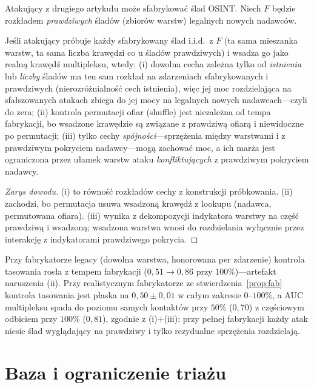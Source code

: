 Atakujący z drugiego artykułu może sfabrykować ślad OSINT. Niech $F$
będzie rozkładem \emph{prawdziwych} śladów (zbiorów warstw) legalnych
nowych nadawców.

\begin{proposition}
\label{prop:fab}
Jeśli atakujący próbuje każdy sfabrykowany ślad i.i.d.\ z $F$ (ta sama
mieszanka warstw, ta sama liczba krawędzi co u śladów prawdziwych) i
wsadza go jako realną krawędź multipleksu, wtedy:
(i) dowolna cecha zależna tylko od \emph{istnienia} lub \emph{liczby}
śladów ma ten sam rozkład na zdarzeniach sfabrykowanych i prawdziwych
(nierozróżnialność cech istnienia), więc jej moc rozdzielająca na
sfałszowanych atakach zbiega do jej mocy na legalnych nowych
nadawcach---czyli do zera;
(ii) kontrola permutacji ofiar (shuffle) jest niezależna od tempa
fabrykacji, bo wsadzone krawędzie są związane z prawdziwą ofiarą i
niewidoczne po permutacji;
(iii) tylko cechy \emph{spójności}---sprzężenia między warstwami i z
prawdziwym pokryciem nadawcy---mogą zachować moc, a ich marża jest
ograniczona przez ułamek warstw ataku \emph{konfliktujących} z prawdziwym
pokryciem nadawcy.
\end{proposition}

\begin{proof}[Zarys dowodu]
(i) to równość rozkładów cechy z konstrukcji próbkowania.
(ii) zachodzi, bo permutacja usuwa wsadzoną krawędź z lookupu
(nadawca, permutowana ofiara). (iii) wynika z dekompozycji indykatora
warstwy na część prawdziwą i wsadzoną; wsadzona warstwa wnosi do
rozdzielania wyłącznie przez interakcję z indykatorami prawdziwego
pokrycia.
\end{proof}

\begin{remark}
Przy fabrykatorze legacy (dowolna warstwa, honorowana per zdarzenie)
kontrola tasowania rosła z tempem fabrykacji ($0{,}51\to0{,}86$ przy
$100\%$)---artefakt naruszenia (ii). Przy realistycznym fabrykatorze ze
stwierdzenia~\ref{prop:fab} kontrola tasowania jest płaska na
$0{,}50\pm0{,}01$ w całym zakresie $0$--$100\%$, a AUC multipleksu spada
do poziomu samych kontaktów przy $50\%$ ($0{,}70$) z częściowym
odbiciem przy $100\%$ ($0{,}81$), zgodnie z (i)+(iii): przy pełnej
fabrykacji każdy atak niesie ślad wyglądający na prawdziwy i tylko
rezydualne sprzężenia rozdzielają.
\end{remark}

\chapter{Baza i ograniczenie triażu}
\label{sec:baserate}

